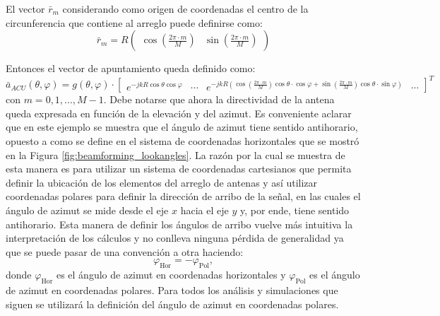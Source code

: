 El vector $\bar{r}_m$ considerando como origen de coordenadas el centro de la circunferencia que contiene al arreglo puede definirse como:
\begin{equation}
    \bar{r}_m = R \begin{pmatrix}
        \cos(\frac{2\pi\cdot m}{M}) & \sin(\frac{2\pi\cdot m}{M})
    \end{pmatrix}
\end{equation}

Entonces el vector de apuntamiento queda definido como:
\begin{equation}
    \bar{a}_{ACU}(\theta,\varphi) = g(\theta,\varphi) \cdot \begin{bmatrix}
        e^{-jkR\cos\theta \cos\varphi} & \cdots & e^{-jkR(\cos(\frac{2\pi \cdot m}{M})\cos\theta\cdot \cos\varphi+\sin(\frac{2\pi \cdot m}{M})\cos\theta\cdot \sin\varphi)} & \cdots
    \end{bmatrix}^T
\end{equation}
con $m=0,1,...,M-1$.
Debe notarse que ahora la directividad de la antena queda expresada en función de la elevación y del azimut. Es conveniente aclarar que en este ejemplo se muestra que el ángulo de azimut tiene sentido antihorario, opuesto a como se define en el sistema de coordenadas horizontales que se mostró en la Figura \ref{fig:beamforming_lookangles}. La razón por la cual se muestra de esta manera es para utilizar un sistema de coordenadas cartesianos que permita definir la ubicación de los elementos del arreglo de antenas y así utilizar coordenadas polares para definir la dirección de arribo de la señal, en las cuales el ángulo de azimut se mide desde el eje $x$ hacia el eje $y$ y, por ende, tiene sentido antihorario. Esta manera de definir los ángulos de arribo vuelve más intuitiva la interpretación de los cálculos y no conlleva ninguna pérdida de generalidad ya que se puede pasar de una convención a otra haciendo:
\begin{equation}
    \varphi_{\textrm{Hor}} = -\varphi_{\textrm{Pol}},
\end{equation}
donde $\varphi_{\textrm{Hor}}$ es el ángulo de azimut en coordenadas horizontales y $\varphi_{\textrm{Pol}}$ es el ángulo de azimut en coordenadas polares. Para todos los análisis y simulaciones que siguen se utilizará la definición del ángulo de azimut en coordenadas polares.

